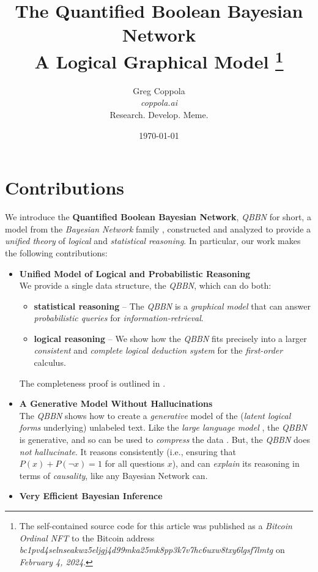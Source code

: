 \documentclass[11pt]{article}
\title{\bf The Quantified Boolean Bayesian Network \\ 
\vspace{10pt}
 \Large \textmd{A Logical Graphical Model
 \thanks{The self-contained source code for this article was published as a {\em Bitcoin Ordinal NFT} to the Bitcoin address {\em bc1pvd4selnseakwz5eljgj4d99mka25mk8pp3k7v7hc6uxw8txy6lgsf7lmtg} on {\em February 4, 2024}.
}}
\vspace{25pt}
}
\author{
    {\Large Greg Coppola}
    \\
    {\em coppola.ai} \\
    Research. Develop. Meme.
}
\date{\today}
\begin{document}
\maketitle
\tableofcontents
\section{Contributions}
We introduce the {\bf Quantified Boolean Bayesian Network}, {\em QBBN} for short, a model from the {\em Bayesian Network} family \cite{pearl1988probabilistic, neapolitan2003learning}, constructed and analyzed to provide a {\em unified theory} of {\em logical} and {\em statistical} {\em reasoning}.
In particular, our work makes the following contributions:
\begin{itemize}
    \item {\bf Unified Model of Logical and Probabilistic Reasoning} \\ 
        We provide a single data structure, the {\em QBBN}, which can do both:
        \begin{itemize}
            \item {\bf statistical reasoning} -- The {\em QBBN} is a {\em graphical model} that can answer {\em probabilistic queries} \cite{koller2009probabilistic} for {\em information-retrieval}.
            \item {\bf logical reasoning} -- We show how the {\em QBBN} fits precisely into a larger {\em consistent} and {\em complete} {\em logical deduction system} \cite{Gentzen1934} for the {\em first-order} calculus.
        \end{itemize}
        The completeness proof is outlined in \cite{Coppola2024}.
    \item {\bf A Generative Model Without Hallucinations} \\
        The {\em QBBN} shows how to create a {\em generative} model of the ({\em latent logical forms} underlying) unlabeled text.
        Like the {\em large language model} \cite{Bahdanau2014NeuralMT, vaswani2017attention, radford2018improving}, the {\em QBBN} is generative, and so can be used to {\em compress} the data \cite{SutskeverObservation}.
        But, the {\em QBBN} does {\em not} {\em hallucinate}.
        It reasons consistently (i.e., ensuring that $P(x) + P(\neg x) = 1$ for all questions $x$), and can {\em explain} its reasoning in terms of {\em causality}, like any Bayesian Network can.
    \item {\bf Very Efficient Bayesian Inference} \\

\end{itemize}
\end{document}
